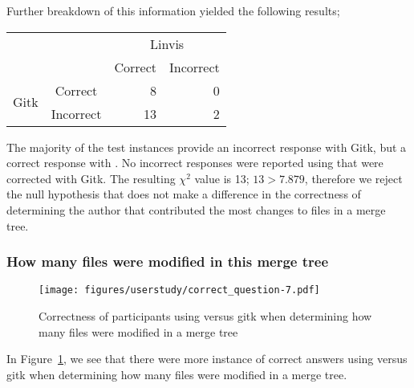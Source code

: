 Further breakdown of this information yielded the following results;



\begin{center}
  \begin{tabular}{cc|rr}
                           &           & \multicolumn{2}{c}{Linvis}\\
                           &           & Correct                      & Incorrect\\\hline
    \multirow{2}{*}{Gitk}  & Correct   & 8                            & 0\\
                           & Incorrect & 13                           & 2\\
  \end{tabular}
\end{center}

The majority of the test instances provide an incorrect response with
Gitk, but a correct response with \tool. No incorrect responses were
reported using \tool that were corrected with Gitk. The resulting
$\chi^2$ value is 13; $13 > 7.879$, therefore we reject the null
hypothesis that \tool does not make a difference in the correctness of
determining the author that contributed the most changes to files in a
merge tree.

\subsubsection{How many files were modified in this merge tree}
\label{ssub:how_many_files_were_modified_in_this_merge_tree}

\begin{figure}[htpb]
  \centering
  \texttt{[image: figures/userstudy/correct\_question-7.pdf]}
  \caption{Correctness of participants using \tool versus gitk when
    determining how many files were modified in a merge tree}
  \label{fig:q_7_correctness}
\end{figure}

In Figure~\ref{fig:q_7_correctness}, we see that there were more
instance of correct answers using \tool versus gitk when determining how
many files were modified in a merge tree.


